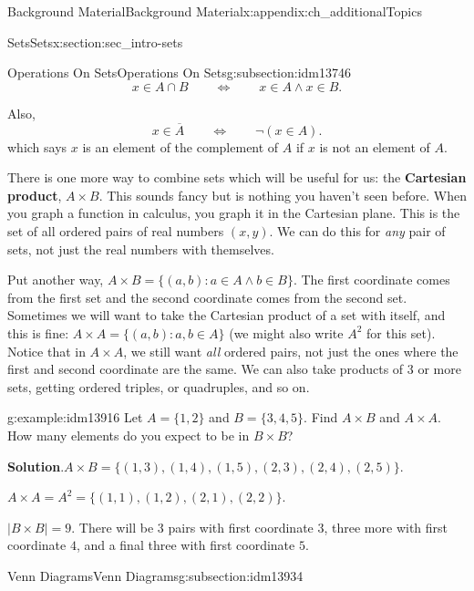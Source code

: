 \documentclass[oneside,10pt,]{book}
\newcommand{\terminology}[1]{\textbf{#1}}
\numberwithin{equation}{chapter}
\def\st{:}
\def\Iff{\Leftrightarrow}
\begin{document}
\begin{appendixptx}{Background Material}{}{Background Material}{}{}{x:appendix:ch_additionalTopics}
\begin{sectionptx}{Sets}{}{Sets}{}{}{x:section:sec_intro-sets}
\begin{subsectionptx}{Operations On Sets}{}{Operations On Sets}{}{}{g:subsection:idm13746}
\begin{equation*}
x \in A \cap B \qquad \Iff \qquad x \in A \wedge x \in B.
\end{equation*}
%
\par
Also,%
\begin{equation*}
x \in \overline A \qquad \Iff \qquad \neg (x \in A).
\end{equation*}
which says \(x\) is an element of the complement of \(A\) if \(x\) is not an element of \(A\).%
\par
There is one more way to combine sets which will be useful for us: the \terminology{Cartesian product}, \(A \times B\)\label{g:notation:idm13903}. This sounds fancy but is nothing you haven't seen before. When you graph a function in calculus, you graph it in the Cartesian plane. This is the set of all ordered pairs of real numbers \((x,y)\). We can do this for \emph{any} pair of sets, not just the real numbers with themselves.%
\par
Put another way, \(A \times B = \{(a,b) \st a \in A \wedge b \in B\}\). The first coordinate comes from the first set and the second coordinate comes from the second set. Sometimes we will want to take the Cartesian product of a set with itself, and this is fine: \(A \times A = \{(a,b) \st a, b \in A\}\) (we might also write \(A^2\) for this set). Notice that in \(A \times A\), we still want \emph{all} ordered pairs, not just the ones where the first and second coordinate are the same. We can also take products of 3 or more sets, getting ordered triples, or quadruples, and so on.%
\begin{example}{}{g:example:idm13916}%
Let \(A = \{1,2\}\) and \(B = \{3,4,5\}\). Find \(A \times B\) and \(A \times A\). How many elements do you expect to be in \(B \times B\)?%
\par\smallskip%
\noindent\textbf{Solution}.\hypertarget{g:solution:idm13924}{}\quad{}\(A \times B = \{(1,3), (1,4), (1,5), (2,3), (2,4), (2,5)\}\).%
\par
\(A \times A = A^2 = \{(1,1), (1,2), (2,1), (2,2)\}\).%
\par
\(|B\times B| = 9\). There will be 3 pairs with first coordinate \(3\), three more with first coordinate \(4\), and a final three with first coordinate \(5\).%
\end{example}
\end{subsectionptx}
%
%
\typeout{************************************************}
\typeout{************************************************}
%
\begin{subsectionptx}{Venn Diagrams}{}{Venn Diagrams}{}{}{g:subsection:idm13934}

\end{subsectionptx}
\end{sectionptx}
\end{appendixptx}
\end{document}
